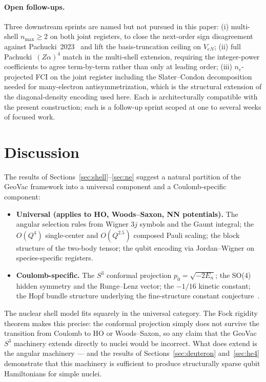 \documentclass[twocolumn,prc,amsmath,amssymb,superscriptaddress]{revtex4-2}
\begin{document}
\paragraph{Open follow-ups.}
Three downstream sprints are named but not pursued in this paper:
(i) multi-shell $n_{\max} \geq 2$ on both joint registers, to close
the next-order sign disagreement against
Pachucki~2023~\cite{Pachucki2023} and lift the basis-truncation
ceiling on $V_{eN}$; (ii) full Pachucki~$(Z\alpha)^4$ match in the
multi-shell extension, requiring the integer-power coefficients to
agree term-by-term rather than only at leading order; (iii) $n_e$-projected
FCI on the joint register including the Slater--Condon decomposition
needed for many-electron antisymmetrization, which is the structural
extension of the diagonal-density encoding used here. Each is
architecturally compatible with the present construction; each is a
follow-up sprint scoped at one to several weeks of focused work.

\section{Discussion}
\label{sec:discussion}

The results of Sections~\ref{sec:shell}--\ref{sec:ne} suggest a natural
partition of the GeoVac framework into a universal component and a
Coulomb-specific component:

\begin{itemize}
  \item \textbf{Universal (applies to HO, Woods--Saxon, NN potentials).}
    The angular selection rules from Wigner $3j$ symbols and the Gaunt
    integral; the $O(Q^4)$ single-center and $O(Q^{2.5})$ composed
    Pauli scaling; the block structure of the two-body tensor; the
    qubit encoding via Jordan--Wigner on species-specific registers.
  \item \textbf{Coulomb-specific.} The $S^3$ conformal projection
    $p_0 = \sqrt{-2E_n}$; the SO(4) hidden symmetry and the Runge--Lenz
    vector; the $-1/16$ kinetic constant; the Hopf bundle structure
    underlying the fine-structure constant
    conjecture~\cite{Paper2}.
\end{itemize}

The nuclear shell model fits squarely in the universal category. The
Fock rigidity theorem makes this precise: the conformal projection
simply does not survive the transition from Coulomb to HO or
Woods--Saxon, so any claim that the GeoVac $S^3$ machinery extends
directly to nuclei would be incorrect. What does extend is the
angular machinery --- and the results of Sections~\ref{sec:deuteron}
and~\ref{sec:he4} demonstrate that this machinery is sufficient to
produce structurally sparse qubit Hamiltonians for simple nuclei.
\end{document}
